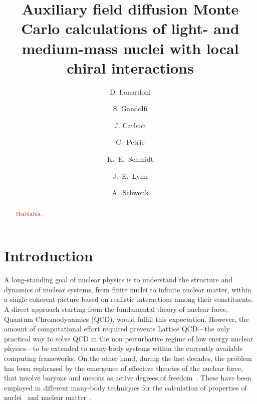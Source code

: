 \documentclass[aps,prc,twocolumn,superscriptaddress,floatfix]{revtex4-1}
\newcommand{\red}[1]{\protect\textcolor{red}{#1}}
\begin{document}
\title{Auxiliary field diffusion Monte Carlo calculations of light- and medium-mass nuclei with local chiral interactions}

\author{D. Lonardoni}

\author{S. Gandolfi}
\author{J. Carlson}

\author{C.~Petrie}
\author{K.~E.~Schmidt}

\author{J.~E.~Lynn}

\author{A.~Schwenk}


\begin{abstract}
\red{Blablabla\ldots}
\end{abstract}

\maketitle

\section{Introduction}
\label{sec:intro}
A long-standing goal of nuclear physics is to understand the structure and dynamics 
of nuclear systems, from finite nuclei to infinite nuclear matter, within a single 
coherent picture based on realistic interactions among their constituents.
A direct approach starting from the fundamental theory of nuclear force, Quantum Chromodynamics (QCD), 
would fulfill this expectation. However, the amount of computational effort required prevents 
Lattice QCD---the only practical way to solve QCD in the non perturbative regime of low energy 
nuclear physics---to be extended to many-body systems within the currently available computing frameworks.
On the other hand, during the last decades, the problem has been rephrased by the emergence of 
effective theories of the nuclear force, that involve baryons and mesons as active degrees of 
freedom~\cite{Wiringa:1995,Epelbaum:2009,Machleidt:2011,Ekstrom:2013,Gezerlis:2014,Entem:2015,
Epelbaum:2015,Ekstrom:2015,Piarulli:2015,Lynn:2016,Ekstrom:2017}. These have been 
employed in different many-body techniques for the calculation of properties of 
nuclei~\cite{Barrett:2013,Hagen:2013,Carlson:2015,Hergert:2015} 
and nuclear matter~\cite{Akmal:1998,Hebeler:2013,Carlson:2015,Hagen:2014}.
\end{document}
